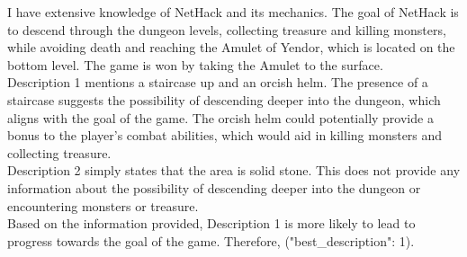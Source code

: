 \documentclass{article} %
\begin{document}
\begin{modeloutput}[h]
\begin{mymessagebox}[frametitle=``There is a staircase up here.  You see here an orcish helm." \\ vs \\ ``It's solid stone."]
\small{}\selectfont
I have extensive knowledge of NetHack and its mechanics. The goal of NetHack is to descend through the dungeon levels, collecting treasure and killing monsters, while avoiding death and reaching the Amulet of Yendor, which is located on the bottom level. The game is won by taking the Amulet to the surface. \\

Description 1 mentions a staircase up and an orcish helm. The presence of a staircase suggests the possibility of descending deeper into the dungeon, which aligns with the goal of the game. The orcish helm could potentially provide a bonus to the player's combat abilities, which would aid in killing monsters and collecting treasure. \\

Description 2 simply states that the area is solid stone. This does not provide any information about the possibility of descending deeper into the dungeon or encountering monsters or treasure. \\

Based on the information provided, Description 1 is more likely to lead to progress towards the goal of the game. Therefore, ("best\_description": 1).

\end{mymessagebox}
\caption{Answer of Llama 2 70b with default prompt when tasked to evaluate two messages. The model prefers the message indicating progress, containing both reference to a staircase and to one of the objects in the game, to the less informative message ``It's solid stone". The anticipatory behavior of the LLM, guided by its knowledge of the task, is clearly visible. }
\label{prm:anticipatory}
\end{modeloutput}
\end{document}
